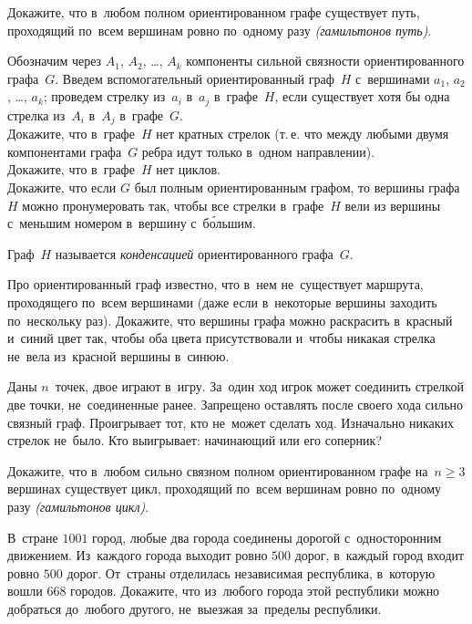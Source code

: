 \begin{problems}

\item
Докажите, что в~любом полном ориентированном графе существует путь, проходящий
по~всем вершинам ровно по~одному разу \emph{(гамильтонов путь)}.

\item
Обозначим через $A_{1}$, $A_{2}$, \ldots, $A_{k}$ компоненты сильной связности
ориентированного графа~$G$.
Введем вспомогательный ориентированный граф~$H$ с~вершинами
$a_{1}$, $a_{2}$, \ldots, $a_{k}$;
проведем стрелку из~$a_{i}$ в~$a_{j}$ в~графе~$H$, если существует хотя бы одна
стрелка из~$A_{i}$ в~$A_{j}$ в~графе~$G$.
\\
\subproblem
Докажите, что в~графе~$H$ нет кратных стрелок (т.\,е. что между любыми двумя
компонентами графа~$G$ ребра идут только в~одном направлении).
\\
\subproblem
Докажите, что в~графе~$H$ нет циклов.
\\
\subproblem
Докажите, что если $G$ был полным ориентированным графом, то вершины графа~$H$
можно пронумеровать так, чтобы все стрелки в~графе~$H$ вели из вершины
с~меньшим номером в~вершину с~б\'{о}льшим.
\par
Граф~$H$ называется \emph{конденсацией} ориентированного графа~$G$.

\item
Про ориентированный граф известно, что в~нем не~существует маршрута,
проходящего по~всем вершинами
(даже если в~некоторые вершины заходить по~нескольку раз).
Докажите, что вершины графа можно раскрасить в~красный и~синий цвет так, чтобы
оба цвета присутствовали и~чтобы никакая стрелка не~вела из~красной вершины
в~синюю.

\item
Даны $n$~точек, двое играют в~игру.
За~один ход игрок может соединить стрелкой две точки, не~соединенные ранее.
Запрещено оставлять после своего хода сильно связный граф.
Проигрывает тот, кто не~может сделать ход.
Изначально никаких стрелок не~было.
Кто выигрывает: начинающий или его соперник?

\item
Докажите, что в~любом сильно связном полном ориентированном графе на~$n \geq 3$
вершинах существует цикл, проходящий по~всем вершинам ровно по~одному разу
\emph{(гамильтонов цикл)}.

\item
В~стране $1001$ город, любые два города соединены дорогой с~односторонним
движением.
Из~каждого города выходит ровно $500$ дорог, в~каждый город входит ровно
$500$ дорог.
От~страны отделилась независимая республика, в~которую вошли $668$ городов.
Докажите, что из~любого города этой республики можно добраться до~любого
другого, не~выезжая за~пределы республики.

\end{problems}


